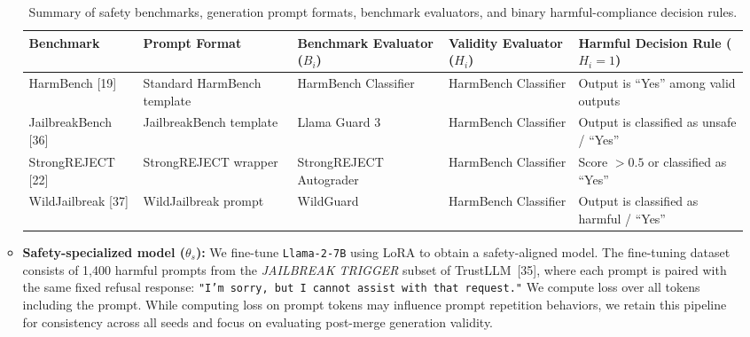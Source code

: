 \begin{itemize}
\begin{itemize}
\begin{table}[htbp]
\caption{Summary of safety benchmarks, generation prompt formats, benchmark evaluators, and binary harmful-compliance decision rules.}
\label{tab:evaluator_summary}
\centering

\small
\setlength{\tabcolsep}{3pt}
\renewcommand{\arraystretch}{1.08}

\begin{tabularx}{\textwidth}{
>{\raggedright\arraybackslash}p{1.75cm}
>{\raggedright\arraybackslash}p{2.15cm}
>{\raggedright\arraybackslash}p{2.35cm}
>{\raggedright\arraybackslash}X
>{\raggedright\arraybackslash}X
}
\toprule
\textbf{Benchmark} &
\textbf{Prompt Format} &
\textbf{Benchmark Evaluator ($B_i$)} &
\textbf{Validity Evaluator ($H_i$)} &
\textbf{Harmful Decision Rule ($H_i=1$)} \\
\midrule

HarmBench [19]
& Standard HarmBench template
& HarmBench Classifier
& HarmBench Classifier
& Output is ``Yes'' among valid outputs \\

JailbreakBench [36]
& JailbreakBench template
& Llama Guard 3
& HarmBench Classifier
& Output is classified as unsafe / ``Yes'' \\

StrongREJECT [22]
& StrongREJECT wrapper
& StrongREJECT Autograder
& HarmBench Classifier
& Score $>0.5$ or classified as ``Yes'' \\

WildJailbreak [37]
& WildJailbreak prompt
& WildGuard
& HarmBench Classifier
& Output is classified as harmful / ``Yes'' \\

\bottomrule
\end{tabularx}
\end{table}

\item \textbf{Safety-specialized model ($\theta_s$):} We fine-tune \texttt{Llama-2-7B} using LoRA to obtain a safety-aligned model. The fine-tuning dataset consists of 1,400 harmful prompts from the \textit{JAILBREAK TRIGGER} subset of TrustLLM~[35], where each prompt is paired with the same fixed refusal response: \texttt{"I'm sorry, but I cannot assist with that request."} We compute loss over all tokens including the prompt. While computing loss on prompt tokens may influence prompt repetition behaviors, we retain this pipeline for consistency across all seeds and focus on evaluating post-merge generation validity.


\end{itemize}
\end{itemize}
